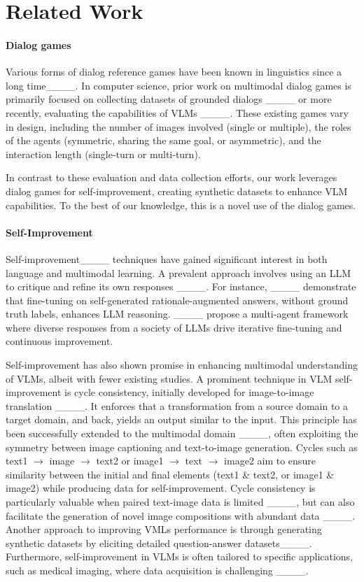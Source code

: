 \section{Related Work}
\label{sec:relwork}

\paragraph{Dialog games}

Various forms of dialog reference games have been known in linguistics since a long time____.
In computer science, prior work on multimodal dialog games is primarily focused on collecting datasets of grounded dialogs ____ or more recently, evaluating the capabilities of VLMs ____.  
These existing games vary in design, including the number of images involved (single or multiple), the roles of the agents (symmetric, sharing the same goal, or asymmetric), and the interaction length (single-turn or multi-turn).

In contrast to these evaluation and data collection efforts, our work leverages dialog games for self-improvement, creating synthetic datasets to enhance VLM capabilities.
To the best of our knowledge, this is a novel use of the dialog games.

\paragraph{Self-Improvement}

Self-improvement____ techniques have gained significant interest in both language and multimodal learning.
A prevalent approach involves using an LLM to critique and refine its own responses ____.
For instance, ____ demonstrate that fine-tuning on self-generated rationale-augmented answers, without ground truth labels, enhances LLM reasoning. 
____ propose a multi-agent framework where diverse responses from a society of LLMs drive iterative fine-tuning and continuous improvement.

Self-improvement has also shown promise in enhancing multimodal understanding of VLMs, albeit with fewer existing studies.
A prominent technique in VLM self-improvement is cycle consistency, initially developed for image-to-image translation ____.
It enforces that a transformation from a source domain to a target domain, and back, yields an output similar to the input.
This principle has been successfully extended to the multimodal domain ____, often exploiting the symmetry between image captioning and text-to-image generation.
Cycles such as text1 $\rightarrow$ image  $\rightarrow$ text2 or image1  $\rightarrow$ text  $\rightarrow$ image2 aim to ensure similarity between the initial and final elements (text1 \& text2, or image1 \& image2) while producing data for self-improvement. 
Cycle consistency is particularly valuable when paired text-image data is limited ____, but can also facilitate the generation of novel image compositions with abundant data ____. 
Another approach to improving VMLs performance is through generating synthetic datasets by eliciting detailed question-answer datasets____.
Furthermore, self-improvement in VLMs is often tailored to specific applications, such as medical imaging, where data acquisition is challenging ____.

